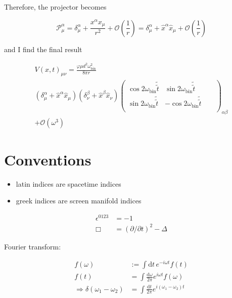 \documentclass[11pt]{article}
\begin{document}
Therefore, the projector becomes

\begin{equation}
	\mathcal{P}_\mu^\alpha 
	= \delta_\mu^\alpha 
	+ \frac{x^\alpha x_\mu}{r^2}
	+ \mathcal{O} \left( \frac{1}{r} \right)
	= \delta_\mu^\alpha 
	+ \hat x^\alpha \hat x_\mu
	+ \mathcal{O} \left( \frac{1}{r} \right)
\end{equation}

and I find the final result

\begin{multline} \label{sol_V_TT}
	V
	\left( x, t\right)_{\mu \nu}
	=
	\frac{\varphi \mu d^2 \omega_{\text{bin}}^2}{8 \pi r}
	\\
	\left(
		\delta_\mu^\alpha 
		+ \hat x^\alpha \hat x_\mu
	\right)
	\left(
		\delta_\nu^\beta
		+ \hat x^\beta \hat x_\nu
	\right)
	\begin{pmatrix}
		\cos{2 \omega_{\text{bin}} \tilde{ \tilde{ t}}}
		 & \sin{2 \omega_{\text{bin}} \tilde{ \tilde{ t}}}
		 &
		 \\
		 \sin{2 \omega_{\text{bin}} \tilde{ \tilde{ t}}}
		 & - \cos{2 \omega_{\text{bin}} \tilde{ \tilde{ t}}}
		 &
		 \\
		 &
		 &
		 &
	\end{pmatrix}_{\alpha \beta}
	\\
	+ \mathcal{O} \left( \omega^3 \right)
\end{multline}


\section{Conventions}

\begin{itemize}
	\item latin indices are spacetime indices
	\item greek indices are screen manifold indices
\end{itemize}

\begin{align} \label{conv_eps}
	\epsilon^{0 1 2 3} &=  - 1\\
	\Box &= \left( \partial / \partial t \right)^2 -  \Delta
\end{align}

Fourier transform:

\begin{align}
	f \left( \omega \right) 
	&:= \int \mathrm{d} t \, e^{-i \omega t} f \left( t \right) \\
	f \left( t \right)
	&= \int \frac{\mathrm{d} \omega}{2 \pi} e^{i \omega t}  f \left( \omega \right)\\
	\Rightarrow \delta \left( \omega_1 - \omega_2 \right)
	&=  \int \frac{\mathrm{d} t}{2 \pi}  
	e^{i \left( \omega_1 - \omega_2 \right) t}
\end{align}
\end{document}
